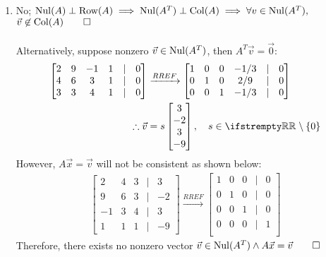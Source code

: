 \documentclass[12pt, a4paper]{article}
\begin{document}
\begin{enumerate}[Q\arabic*.]
\begin{enumerate}[(\alph*)]
    \item No; $\operatorname{Nul}(A) \perp \operatorname{Row}(A) \implies \operatorname{Nul}(A^T) \perp \operatorname{Col}(A) \implies \forall v \in \operatorname{Nul}(A^T),$  $\vec{v} \not\in \operatorname{Col}(A)\qed$\\
      \quad\\
      Alternatively, suppose nonzero $\vec{v} \in \operatorname{Nul}(A^T)$, then $A^T \vec{v} = \vec{0}$:
      \begin{align*}
        \begin{bmatrix}
          2 & 9 & -1 & 1 & | & 0 \\
          4 & 6 & 3 & 1 & |& 0\\
          3 & 3 & 4 & 1 & | & 0\\
        \end{bmatrix}&\xrightarrow{RREF}
        \begin{bmatrix}
          1 & 0 & 0 & -1 /3 & | & 0 \\
          0 & 1 & 0 & 2 /9 & |& 0\\
          0 & 0 & 1 & -1 /3 & | & 0\\
        \end{bmatrix}\\
        \therefore \vec{v} &= s\begin{bmatrix}3\\-2\\3\\-9\end{bmatrix},\quad s\in \RR \setminus \{0\}
      \end{align*}
      However, $A\vec{x} = \vec{v}$ will not be consistent as shown below:
      \begin{align*}
        \begin{bmatrix}
          2 & 4 & 3 & | & 3\\
          9 & 6 & 3 & | & -2\\
          -1 & 3 & 4 & | & 3\\
          1 & 1 & 1 & | & -9
        \end{bmatrix}\xrightarrow{RREF}
        \begin{bmatrix}
          1 & 0 & 0 & | & 0\\
          0 & 1 & 0 & | & 0\\
          0 & 0 & 1 & | & 0\\
          0 & 0 & 0 & | & 1\\
        \end{bmatrix} 
      \end{align*}
      Therefore, there exists no nonzero vector $\vec{v} \in \operatorname{Nul}(A^T) \land A \vec{x} = \vec{v} \qed$
    \end{enumerate}
  \pagebreak


\end{enumerate}
\end{document}
